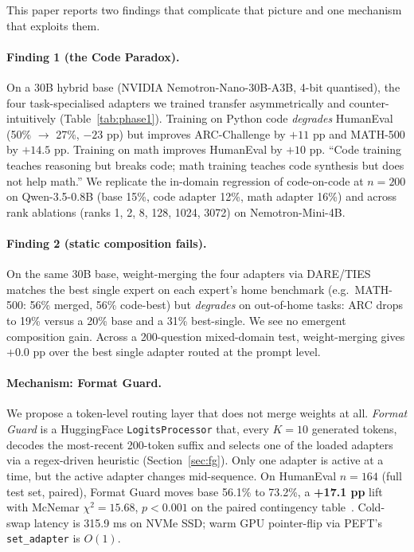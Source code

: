 \documentclass{article}
\begin{document}
This paper reports two findings that complicate that picture and one mechanism that exploits them.

\paragraph{Finding 1 (the Code Paradox).} On a 30B hybrid base (NVIDIA Nemotron-Nano-30B-A3B, 4-bit quantised), the four task-specialised adapters we trained transfer asymmetrically and counter-intuitively (Table~\ref{tab:phase1}). Training on Python code \emph{degrades} HumanEval (50\% $\rightarrow$ 27\%, $-23$ pp) but improves ARC-Challenge by $+11$ pp and MATH-500 by $+14.5$ pp. Training on math improves HumanEval by $+10$ pp. ``Code training teaches reasoning but breaks code; math training teaches code synthesis but does not help math.'' We replicate the in-domain regression of code-on-code at $n=200$ on Qwen-3.5-0.8B (base 15\%, code adapter 12\%, math adapter 16\%) and across rank ablations (ranks 1, 2, 8, 128, 1024, 3072) on Nemotron-Mini-4B.

\paragraph{Finding 2 (static composition fails).} On the same 30B base, weight-merging the four adapters via DARE/TIES matches the best single expert on each expert's home benchmark (e.g.\ MATH-500: 56\% merged, 56\% code-best) but \emph{degrades} on out-of-home tasks: ARC drops to 19\% versus a 20\% base and a 31\% best-single. We see no emergent composition gain. Across a 200-question mixed-domain test, weight-merging gives $+0.0$ pp over the best single adapter routed at the prompt level.

\paragraph{Mechanism: Format Guard.} We propose a token-level routing layer that does not merge weights at all. \emph{Format Guard} is a HuggingFace \texttt{LogitsProcessor} that, every $K=10$ generated tokens, decodes the most-recent 200-token suffix and selects one of the loaded adapters via a regex-driven heuristic (Section~\ref{sec:fg}). Only one adapter is active at a time, but the active adapter changes mid-sequence. On HumanEval $n=164$ (full test set, paired), Format Guard moves base 56.1\% to 73.2\%, a \textbf{+17.1 pp} lift with McNemar $\chi^2 = 15.68$, $p < 0.001$ on the paired contingency table~\citep{dietterich1998approximate}. Cold-swap latency is 315.9 ms on NVMe SSD; warm GPU pointer-flip via PEFT's \texttt{set\_adapter} is $O(1)$.
\end{document}
